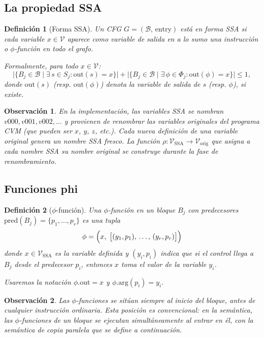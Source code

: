 \documentclass[12pt, a4paper]{article}
\newtheorem{definition}{Definición}[section]
\newtheorem{remark}{Observación}[section]
\begin{document}
\subsection{La propiedad SSA}

\begin{definition}[Forma SSA]
\label{def:ssa}
Un CFG $G = (\mathcal{B},\, \mathrm{entry})$ está en \emph{forma SSA} si cada variable
$x \in \mathcal{V}$ aparece como variable de salida en \emph{a lo sumo una} instrucción o
$\phi$-función en todo el grafo.

Formalmente, para todo $x \in \mathcal{V}$:
\[
  \bigl|\{B_j \in \mathcal{B} \mid \exists\, s \in S_j : \mathrm{out}(s) = x\}\bigr|
  +
  \bigl|\{B_j \in \mathcal{B} \mid \exists\, \phi \in \Phi_j : \mathrm{out}(\phi) = x\}\bigr|
  \leq 1,
\]
donde $\mathrm{out}(s)$ (resp. $\mathrm{out}(\phi)$) denota la variable de salida de $s$ (resp.
$\phi$), si existe.
\end{definition}

\begin{remark}
En la implementación, las variables SSA se nombran $v000, v001, v002, \ldots$ y provienen de
renombrar las variables originales del programa CVM (que pueden ser $x$, $y$, $z$, etc.). Cada
nueva definición de una variable original genera un nombre SSA fresco. La función
$\rho : \mathcal{V}_{\mathrm{SSA}} \to \mathcal{V}_{\mathrm{orig}}$ que asigna a cada nombre SSA
su nombre original se construye durante la fase de renombramiento.
\end{remark}

\subsection{Funciones phi}

\begin{definition}[$\phi$-función]
\label{def:phi}
Una \emph{$\phi$-función} en un bloque $B_j$ con predecesores $\mathrm{pred}(B_j) = \{p_1,\ldots,p_r\}$ es una tupla
\[
  \phi = \Bigl(x,\; \bigl[(y_1, p_1),\, \ldots,\, (y_r, p_r)\bigr]\Bigr)
\]
donde $x \in \mathcal{V}_{\mathrm{SSA}}$ es la variable definida y $(y_i, p_i)$ indica que si el
control llega a $B_j$ desde el predecesor $p_i$, entonces $x$ toma el valor de la variable $y_i$.

Usaremos la notación $\phi.\mathrm{out} = x$ y $\phi.\mathrm{arg}(p_i) = y_i$.
\end{definition}

\begin{remark}
Las $\phi$-funciones se sitúan siempre al \emph{inicio} del bloque, antes de cualquier
instrucción ordinaria. Esta posición es convencional: en la semántica, las $\phi$-funciones de
un bloque se ejecutan \emph{simultáneamente} al entrar en él, con la semántica de copia paralela
que se define a continuación.
\end{remark}
\end{document}
